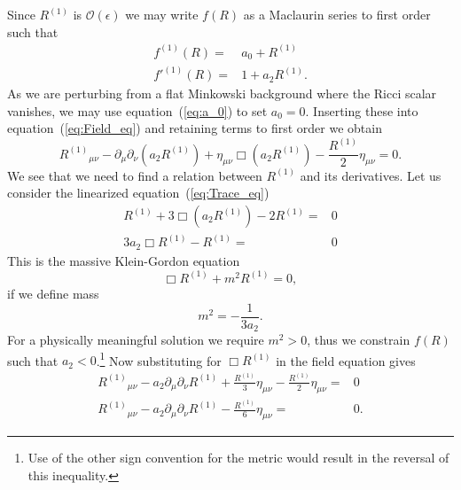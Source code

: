 \documentclass[a4paper, 11pt, titlepage, twoside]{report}
\newcommand{\eqnref}[1]{equation~(\ref{eq:#1})}
\newcommand{\recip}[1]{\ensuremath{\frac{1}{#1}}}
\newcommand{\order}[1]{\ensuremath{\mathcal{O}({#1})}}
\begin{document}
{Since $R^{(1)}$ is $\order{\epsilon}$ we may write $f(R)$ as a Maclaurin series to first order such that
\begin{align}
f^{(1)}(R) = {} & a_0 + R^{(1)}\\
{f'}^{(1)}(R) = {} & 1 + a_2 R^{(1)}.
\end{align}
As we are perturbing from a flat Minkowski background where the Ricci scalar vanishes, we may use \eqnref{a_0} to set $a_0 = 0$. Inserting these into \eqnref{Field_eq} and retaining terms to first order we obtain
\begin{equation}
{R^{(1)}}_{\mu\nu} - \partial_\mu\partial_\nu(a_2 R^{(1)}) + \eta_{\mu\nu}\Box(a_2 R^{(1)}) - \frac{R^{(1)}}{2}\eta_{\mu\nu} = 0.
\end{equation}
We see that we need to find a relation between $R^{(1)}$ and its derivatives. Let us consider the linearized \eqnref{Trace_eq}
\begin{align}
R^{(1)} + 3 \Box(a_2 R^{(1)}) - 2 R^{(1)} = {} & 0 \nonumber \\
3a_2 \Box R^{(1)} - R^{(1)} = {} & 0
\label{eq:Box_R}
\end{align}
This is the massive Klein-Gordon equation
\begin{equation}
\Box R^{(1)} + m^2R^{(1)} = 0,
\end{equation}
if we define mass
\begin{equation}
m^2 = -\recip{3a_2}.
\end{equation}
For a physically meaningful solution we require $m^2 > 0$, thus we constrain $f(R)$ such that $a_2 < 0$.\footnote{Use of the other sign convention for the metric would result in the reversal of this inequality.} Now substituting for $\Box R^{(1)}$ in the field equation gives
\begin{align}
{R^{(1)}}_{\mu\nu} - a_2 \partial_\mu\partial_\nu R^{(1)} + \frac{R^{(1)}}{3}\eta_{\mu\nu} - \frac{R^{(1)}}{2}\eta_{\mu\nu} = {} & 0 \nonumber \\
{R^{(1)}}_{\mu\nu} - a_2\partial_\mu\partial_\nu R^{(1)} - \frac{R^{(1)}}{6}\eta_{\mu\nu} = {} & 0.
\label{eq:Field}
\end{align}

}
\end{document}
